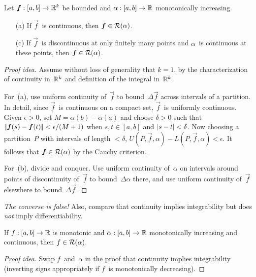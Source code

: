 \begin{thm}
Let \(\boldsymbol{f}:[a,b]\to\mathbb{R}^k\) be bounded and \(\alpha:[a,b]\to\mathbb{R}\) monotonically increasing.
\begin{enumerate}[itemsep=0pt]
\item[(a)] If \(\vec{f}\)~is continuous, then \(\boldsymbol{f}\in\mathcal{R}(\alpha)\).
\item[(c)] If \(\vec{f}\)~is discontinuous at only finitely many points and \(\alpha\)~is continuous at these points, then \(\boldsymbol{f}\in\mathcal{R}(\alpha)\).
\end{enumerate}
\end{thm}
\begin{proof}[Proof idea]
Assume without loss of generality that \(k=1\), by the characterization of continuity in~\(\mathbb{R}^k\) and definition of the integral in~\(\mathbb{R}^k\).

For~(a), use uniform continuity of~\(\vec{f}\) to bound~\(\Delta\vec{f}\) across intervals of a partition. In detail, since \(\vec{f}\)~is continuous on a compact set, \(\vec{f}\)~is uniformly continuous. Given \(\epsilon>0\), set \(M=\alpha(b)-\alpha(a)\) and choose \(\delta>0\) such that \(\left|\!\left|{\boldsymbol{f}(s)-\boldsymbol{f}(t)}\right|\!\right|<\epsilon/(M+1)\) when \(s,t\in[a,b]\) and \(|{s-t}|<\delta\). Now choosing a partition~\(P\) with intervals of length \(<\delta\), \(U(P,\vec{f},\alpha)-L(P,\vec{f},\alpha)<\epsilon\). It follows that \(\boldsymbol{f}\in\mathcal{R}(\alpha)\) by the Cauchy criterion.

For~(b), divide and conquer. Use uniform continuity of~\(\alpha\) on intervals around points of discontinuity of~\(\vec{f}\) to bound~\(\Delta\alpha\) there, and use uniform continuity of~\(\vec{f}\) elsewhere to bound~\(\Delta\vec{f}\).
\end{proof}
\begin{rmk}
\emph{The converse is false!} Also, compare that continuity implies integrability but does \emph{not} imply differentiability.
\end{rmk}

\begin{thm}
If \(f:[a,b]\to\mathbb{R}\) is monotonic and \(\alpha:[a,b]\to\mathbb{R}\) monotonically increasing and continuous, then \(f\in\mathcal{R}(\alpha)\).
\end{thm}
\begin{proof}[Proof idea]
Swap \(f\)~and~\(\alpha\) in the proof that continuity implies integrability (inverting signs appropriately if \(f\)~is monotonically decreasing).
\end{proof}

